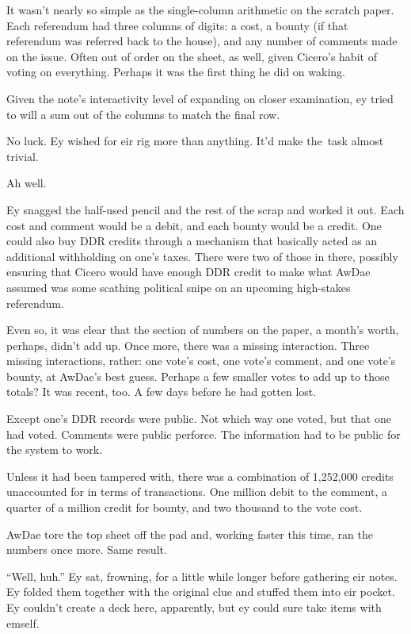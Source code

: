It wasn't nearly so simple as the single-column arithmetic on the scratch paper. Each referendum had three columns of digits: a cost, a bounty (if that referendum was referred back to the house), and any number of comments made on the issue. Often out of order on the sheet, as well, given Cicero's habit of voting on everything. Perhaps it was the first thing he did on waking.

Given the note's interactivity level of expanding on closer examination, ey tried to will a sum out of the columns to match the final row.

No luck. Ey wished for eir rig more than anything. It'd make the\pagebreak\ task almost trivial.

Ah well.

Ey snagged the half-used pencil and the rest of the scrap and worked it out. Each cost and comment would be a debit, and each bounty would be a credit. One could also buy DDR credits through a mechanism that basically acted as an additional withholding on one's taxes. There were two of those in there, possibly ensuring that Cicero would have enough DDR credit to make what AwDae assumed was some scathing political snipe on an upcoming high-stakes referendum.

Even so, it was clear that the section of numbers on the paper, a month's worth, perhaps, didn't add up. Once more, there was a missing interaction. Three missing interactions, rather: one vote's cost, one vote's comment, and one vote's bounty, at AwDae's best guess. Perhaps a few smaller votes to add up to those totals? It was recent, too. A few days before he had gotten lost.

Except one's DDR records were public. Not which way one voted, but that one had voted. Comments were public perforce. The information had to be public for the system to work.

Unless it had been tampered with, there was a combination of 1,252,000 credits unaccounted for in terms of transactions. One million debit to the comment, a quarter of a million credit for bounty, and two thousand to the vote cost.

AwDae tore the top sheet off the pad and, working faster this time, ran the numbers once more. Same result.

``Well, huh.'' Ey sat, frowning, for a little while longer before gathering eir notes. Ey folded them together with the original clue and stuffed them into eir pocket. Ey couldn't create a deck here, apparently, but ey could sure take items with emself.

